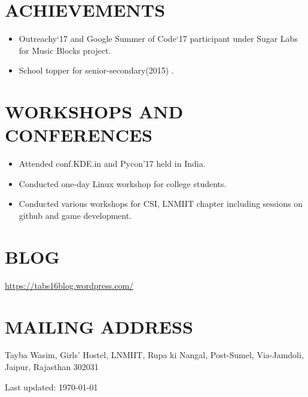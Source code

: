 \documentclass[margin]{res}
\begin{document}
\begin{resume}
\section{ACHIEVEMENTS}
	\begin{itemize}
		\item Outreachy`17 and Google Summer of Code`17 participant under Sugar Labs for Music Blocks project. 
		\item School topper for senior-secondary(2015) .
	\end{itemize}

\section{WORKSHOPS AND CONFERENCES}
	
	\begin{itemize}
		\item Attended conf.KDE.in and Pycon'17 held in India.
		\item Conducted one-day Linux workshop for college students.
		\item Conducted various workshops for CSI, LNMIIT chapter including sessions on github and game development.
\end{itemize} 

\section{BLOG}
\url{https://tabs16blog.wordpress.com/}

\section{MAILING ADDRESS}
Tayba Wasim, Girls' Hostel, LNMIIT, Rupa ki Nangal, Post-Sumel, Via-Jamdoli, Jaipur, Rajasthan 302031


 
\begin{center}
  \begin{footnotesize}
    Last updated: \today \\
  \end{footnotesize}
\end{center}

\end{resume}
\end{document}
